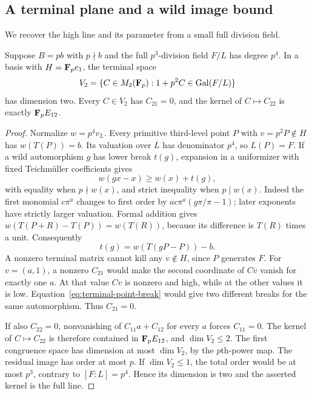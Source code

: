 \subsection{A terminal plane and a wild image bound}
We recover the high line and its parameter from a small full division field.
\begin{lemma}\label{lem:terminal-plane-refinement}
Suppose $B=pb$ with $p\nmid b$ and the full $p^3$-division field $F/L$ has degree $p^4$. In a basis with $H=\mathbf F_pe_1$, the terminal space
\[
 V_2=\{C\in M_2(\mathbf F_p):1+p^2C\in\operatorname{Gal}(F/L)\}
\]
has dimension two. Every $C\in V_2$ has $C_{21}=0$, and the kernel of $C\mapsto C_{22}$ is exactly $\mathbf F_pE_{12}$.
\end{lemma}
\begin{proof}
Normalize $w=p^4v_L$. Every primitive third-level point $P$ with $v=p^2P\notin H$ has $w(T(P))=b$. Its valuation over $L$ has denominator $p^4$, so $L(P)=F$. If a wild automorphism $g$ has lower break $t(g)$, expansion in a uniformizer with fixed Teichm\"uller coefficients gives
\[
 w(gx-x)\ge w(x)+t(g),
\]
with equality when $p\nmid w(x)$, and strict inequality when $p\mid w(x)$. Indeed the first monomial $c\pi^a$ changes to first order by $ac\pi^a(g\pi/\pi-1)$; later exponents have strictly larger valuation. Formal addition gives $w(T(P+R)-T(P))=w(T(R))$, because its difference is $T(R)$ times a unit. Consequently
\begin{equation}\label{eq:terminal-point-break}
                      t(g)=w(T(gP-P))-b.
\end{equation}
A nonzero terminal matrix cannot kill any $v\notin H$, since $P$ generates $F$. For $v=(a,1)$, a nonzero $C_{21}$ would make the second coordinate of $Cv$ vanish for exactly one $a$. At that value $Cv$ is nonzero and high, while at the other values it is low. Equation~\eqref{eq:terminal-point-break} would give two different breaks for the same automorphism. Thus $C_{21}=0$.

If also $C_{22}=0$, nonvanishing of $C_{11}a+C_{12}$ for every $a$ forces $C_{11}=0$. The kernel of $C\mapsto C_{22}$ is therefore contained in $\mathbf F_pE_{12}$, and $\dim V_2\le2$. The first congruence space has dimension at most $\dim V_2$, by the $p$th-power map. The residual image has order at most $p$. If $\dim V_2\le1$, the total order would be at most $p^3$, contrary to $[F:L]=p^4$. Hence its dimension is two and the asserted kernel is the full line.
\end{proof}

